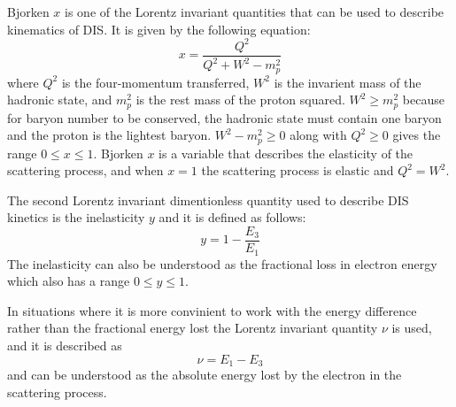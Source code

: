 \documentclass[journal, a4paper,12pt]{IEEEtran}
\begin{document}
Bjorken $x$ is one of the Lorentz invariant quantities that can be used to describe kinematics of DIS. It is given by the following equation: 
\begin{equation}
	x = \frac{Q^2}{Q^2 + W^2 - m_p^2}
\end{equation}
where $Q^2$ is the four-momentum transferred, $W^2$ is the invarient mass of the hadronic state, and $m_p^2$ is the rest mass of the proton squared. $W^2 \geq m_p^2$ because for baryon number to be conserved, the hadronic state must contain one baryon and the proton is the lightest baryon. $W^2 - m_p^2 \geq 0$ along with $Q^2 \geq 0$ gives the range $0 \leq x \leq 1$. Bjorken $x$ is a variable that describes the elasticity of the scattering process, and when $x = 1$ the scattering process is elastic and $Q^2 = W^2$.

The second Lorentz invariant dimentionless quantity used to describe DIS kinetics is the inelasticity $y$ and it is defined as follows:
\begin{equation}
	y = 1-\frac{E_3}{E_1}
\end{equation}
The inelasticity can also be understood as the fractional loss in electron energy which also has a range $0 \leq y \leq 1$.

In situations where it is more convinient to work with the energy difference rather than the fractional energy lost the Lorentz invariant quantity $\nu$ is used, and it is described as
\begin{equation}
	\nu = E_1 - E_3
\end{equation}
and can be understood as the absolute energy lost by the electron in the scattering process.
\end{document}
